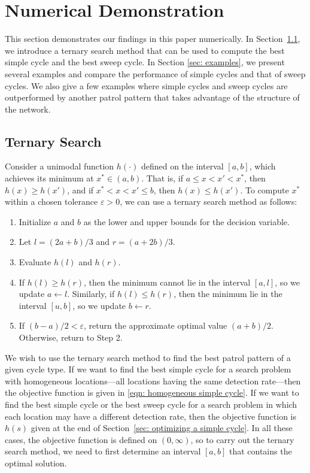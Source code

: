 \documentclass[11pt,a4paper]{article}
\begin{document}
\section{Numerical Demonstration} \label{sec: Numerical Demonstration}
This section demonstrates our findings in this paper numerically.
In Section~\ref{sec: ternary search}, we introduce a ternary search method that can be used to compute the best simple cycle and the best sweep cycle.
In Section \ref{sec: examples}, we present several examples and compare the performance of simple cycles and that of sweep cycles.
We also give a few examples where simple cycles and sweep cycles are outperformed by another patrol pattern that takes advantage of the structure of the network.

\subsection{Ternary Search} \label{sec: ternary search}
Consider a unimodal function $h(\cdot)$ defined on the interval $[a,b]$, which achieves its minimum at $x^* \in (a, b)$.
That is, if $a \leq x < x' < x^*$, then $h(x) \geq h(x')$, and if $x^* < x < x' \leq b$, then $h(x) \leq h(x')$.
To compute $x^*$ within a chosen tolerance $\varepsilon > 0$, we can use a ternary search method as follows:
\begin{enumerate}
    \item Initialize $a$ and $b$ as the lower and upper bounds for the decision variable.
    \item Let $l = (2a + b)/3$ and $r = (a +2b)/3$.
    \item Evaluate $h(l)$ and $h(r)$.
    \item If $h(l) \geq h(r)$, then the minimum cannot lie in the interval $[a, l]$, so we update $a \leftarrow l$.
    Similarly, if $h(l) \leq h(r)$, then the minimum lie in the interval $[u, b]$, so we update $b \leftarrow r$.
    \item If $(b - a) / 2 < \varepsilon$, return the approximate optimal value $(a + b)/2$. Otherwise, return to Step 2.
\end{enumerate}


We wish to use the ternary search method to find the best patrol pattern of a given cycle type.
If we want to find the best simple cycle for a search problem with homogeneous locations---all locations having the same detection rate---then the objective function is given in \eqref{eqn: homogeneous simple cycle}.
If we want to find the best simple cycle or the best sweep cycle for a search problem in which each location may have a different detection rate, then the objective function is $h(s)$ given at the end of Section~\ref{sec: optimizing a simple cycle}.
In all these cases, the objective function is defined on $(0, \infty)$, so to carry out the ternary search method, we need to first determine an interval $[a,b]$ that contains the optimal solution.
\end{document}
